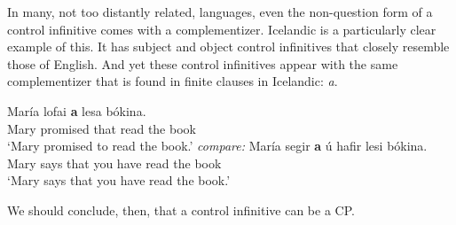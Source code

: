 In many, not too distantly related, languages, even the non-question form of a control infinitive comes with a complementizer. Icelandic is a particularly clear example of this. It has subject and object control infinitives that closely resemble those of English. And yet these control infinitives appear with the same complementizer that is found in finite clauses in Icelandic: \emph{a\dh}.
\pagebreak
\begin{exe}
\ex \label{ex3:icecon} \gll Mar\'ia lofa{\dh}i \textbf{a{\dh}} lesa b\'okina. \\ Mary promised that read {the book}\\ `Mary promised to read the book.'
\sn \emph{compare:}
\sn \gll Mar\'ia segir \textbf{a{\dh}} {\th}\'u hafir lesi{\dh} b\'okina. \\ Mary says that you have read {the book}\\ `Mary says that you have read the book.'
\end{exe}
We should conclude, then, that a control infinitive can be a CP.

